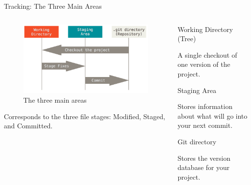 \begin{frame}{Tracking: The Three Main Areas}
  \begin{columns}[t]
    \begin{column}{0.6\textwidth}
      \begin{figure}
        \includegraphics[width=\textwidth]{tracking/areas}
        \caption{The three main areas}
      \end{figure}
      \begin{flushleft}
        Corresponds to the three file stages: Modified, Staged, and Committed.
      \end{flushleft}
    \end{column}
    \begin{column}{0.4\textwidth}
      Working Directory (Tree)
      \begin{flushleft}
        \footnotesize
        A single checkout of one version of the project.
      \end{flushleft}
      Staging Area
      \begin{flushleft}
        \footnotesize
        Stores information about what will go into your next commit.
      \end{flushleft}
      Git directory
      \begin{flushleft}
        \footnotesize
        Stores the version database for your project.
      \end{flushleft}
    \end{column}
  \end{columns}
\end{frame}
